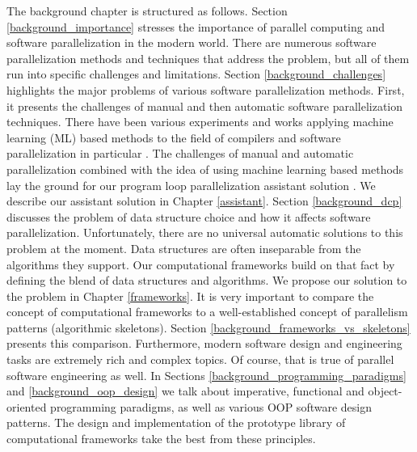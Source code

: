 % 
%
\quad The background chapter is structured as follows. Section \ref{background_importance} stresses the importance of parallel computing and software parallelization in the modern world. There are numerous software parallelization methods and techniques that address the problem, but all of them run into specific challenges and limitations. Section \ref{background_challenges} highlights the major problems of various software parallelization methods. First, it presents the challenges of manual and then automatic software parallelization techniques. There have been various experiments and works applying machine learning (ML) based methods to the field of compilers \cite{ml-oboyle} and software parallelization in particular \cite{fried_ea:2013:icmla}. The challenges of manual and automatic parallelization combined with the idea of using machine learning based methods lay the ground for our program loop parallelization assistant solution \cite{assistant-aiseps}. We describe our assistant solution in Chapter \ref{assistant}.\newline\null
\quad Section \ref{background_dcp} discusses the problem of data structure choice and how it affects software parallelization. Unfortunately, there are no universal automatic solutions to this problem at the moment. Data structures are often inseparable from the algorithms they support. Our computational frameworks build on that fact by defining the blend of data structures and algorithms. We propose our solution to the problem in Chapter \ref{frameworks}. It is very important to compare the concept of computational frameworks to a well-established concept of parallelism patterns (algorithmic skeletons). Section \ref{background_frameworks_vs_skeletons} presents this comparison. Furthermore, modern software design and engineering tasks are extremely rich and complex topics. Of course, that is true of parallel software engineering as well. In Sections \ref{background_programming_paradigms} and \ref{background_oop_design} we talk about imperative, functional and object-oriented programming paradigms, as well as various OOP software design patterns. The design and implementation of the prototype library of computational frameworks take the best from these principles.
